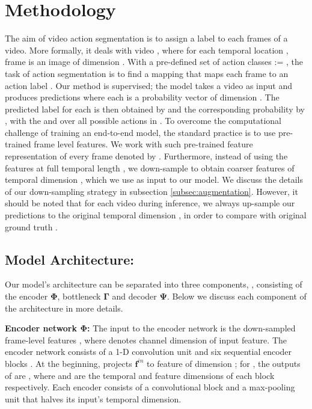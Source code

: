 \documentclass[10pt,twocolumn,letterpaper]{article}
\newcommand{\feat}{\mathbf{f}}
\newcommand{\enc}{\ensuremath{\mathbf{\Phi}}}
\newcommand{\dec}{\ensuremath{\mathbf{\Psi}}}
\newcommand{\bottle}{\ensuremath{\mathbf{\Gamma}}}
\newcommand{\finp}{\ensuremath{\feat^{in}}}
\begin{document}
\section{Methodology}\label{sec:method}

The aim of video action segmentation is to assign a label to each frames of a video. More formally, it deals with video , where for each temporal location , frame  is an image of dimension . With a pre-defined set of  action classes  := , the task of action segmentation is to find a mapping  that maps each frame  to an action label .
Our method is supervised; the model  takes a video  as input and produces predictions  where each  is a probability vector of dimension . The predicted label for each  is then obtained by  and the corresponding probability by , with the  and  over all possible actions in . To overcome the computational challenge of training an end-to-end model, the standard practice is to use pre-trained frame level features. We work with such pre-trained feature representation of every frame  denoted by . Furthermore, instead of using the features at full temporal length , we down-sample  to obtain coarser features  of temporal dimension , which we use as input to our model. We discuss the details of our down-sampling strategy in subsection \ref{subsec:augmentation}.  However, it should be noted that for each video during inference, we always up-sample our predictions  to the original temporal dimension , in order to compare with original ground truth . 

\subsection{Model Architecture:}\label{subsec:model_architec}
Our model's architecture can be separated into three components, \ie , consisting of the encoder \enc{}, bottleneck \bottle{} and decoder \dec{}. Below we discuss each component of the architecture in more details.

\textbf{Encoder network \enc:} The input to the encoder network is the down-sampled frame-level features , where  denotes channel dimension of input feature. The encoder network consists of a 1-D convolution unit  and six sequential encoder blocks . At the beginning,  projects \finp{} to feature of dimension ;
for , the outputs of  are , where  and  are the temporal and feature dimensions of each block  respectively. Each encoder consists of a convolutional block and a max-pooling unit that halves its input's temporal dimension.
\end{document}
